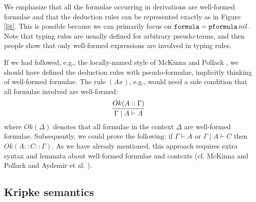 \documentclass{svjour3}                     %
\newcommand{\seq}[2]{\infer{#2}{#1}}
\newcommand{\Ga}{\Gamma}
\newcommand{\De}{\Delta}
\newcommand{\vd}{\vdash}
\newcommand{\tpfml}{\textup{\tt pformula}}
\newcommand{\tfml}{\textup{\tt formula}}
\begin{document}
We emphasize that all the formulae occurring in derivations are well-formed formulae and that the deduction rules can be represented exactly as in Figure \ref{ljt}.
This is possible because we can primarily focus on $\tfml = \tpfml \, nil$.
Note that typing rules are usually defined for arbitrary pseudo-terms, and then people show that only well-formed expressions are involved in typing rules.

  If we had followed, e.g., the locally-named style of McKinna and Pollack \cite{mcpol93,mcpol99}, we should have defined the deduction rules with pseudo-formulae, implicitly thinking of well-formed formulae. The rule $(Ax)$, e.g., would need a side condition that all formulae involved are well-formed:
  \[
  \seq{Ok(A::\Ga)}{\Ga \mid A \vd A}
  \]
  where $Ok(\De)$ denotes that all formulae in the context $\De$ are well-formed formulae. Subsequently, we could prove the following: if $\Ga \vdash A$ or $\Ga \mid A \vdash C$ then $Ok(A::C::\Ga)$.
  As we have already mentioned, this approach requires extra syntax and lemmata about well-formed formulae and contexts (cf. McKinna and Pollack \cite{mcpol93,mcpol99} and Aydemir et al. \cite{engineering}).
  
\subsection{Kripke semantics}
\end{document}
